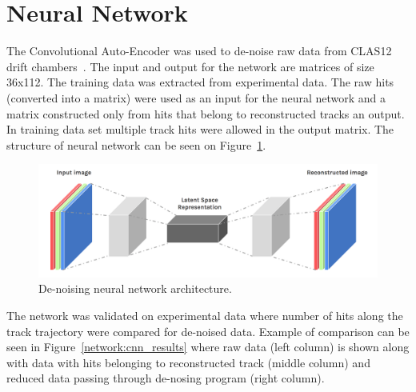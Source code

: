 \section{Neural Network}

The Convolutional Auto-Encoder was used to de-noise raw data from CLAS12 drift chambers~\cite{Thomadakis:2022zcd}. The input and output for the network are matrices of size 36x112. The training data was extracted from experimental data. The raw hits (converted into a matrix) were used as an input for the neural network and a matrix constructed only from hits that belong to reconstructed tracks an output. In training data set multiple track hits were allowed in the output matrix. The structure of neural network can be seen on Figure~\ref{network:cnn_encoder}.

\begin{figure}[!h]
\begin{center}
 \includegraphics[width=5.1in]{images/convolutional-autoencoder.png}
\caption {De-noising neural network architecture.}
 \label{network:cnn_encoder}
 \end{center}
\end{figure}

The network was validated on experimental data where number of hits along the track trajectory were compared for de-noised data.
Example of comparison can be seen in Figure~\ref{network:cnn_results} where raw data (left column) is shown along with data with hits
belonging to reconstructed track (middle column) and reduced data passing through de-nosing program (right column).

